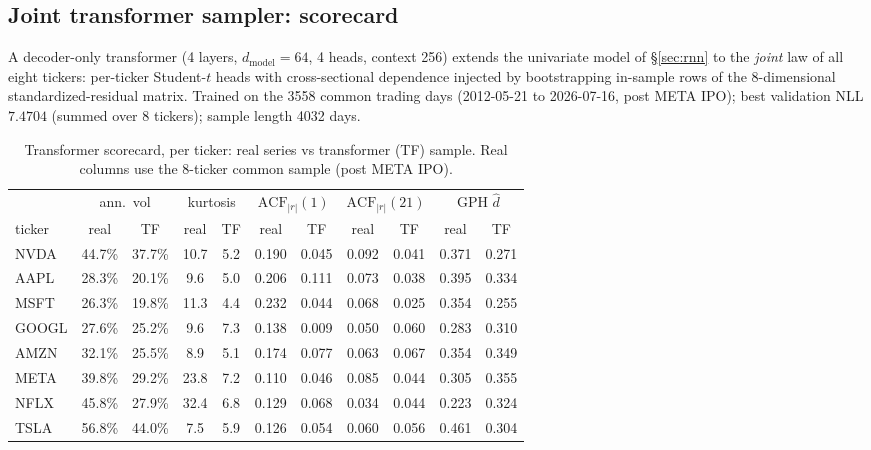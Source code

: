 \documentclass[11pt,a4paper]{article}
\begin{document}
\subsection{Joint transformer sampler: scorecard}\label{sec:v4transformer}

A decoder-only transformer (4 layers, $d_{\mathrm{model}} = 64$, 4 heads,
context 256) extends the univariate model of \S\ref{sec:rnn} to the
\emph{joint} law of all eight tickers: per-ticker Student-$t$ heads with
cross-sectional dependence injected by bootstrapping in-sample rows of the
8-dimensional standardized-residual matrix. Trained on the 3558 common
trading days (2012-05-21 to 2026-07-16, post META IPO); best validation NLL
$7.4704$ (summed over 8 tickers); sample length 4032 days.

\begin{table}[h]
\centering\small
\setlength{\tabcolsep}{4pt}
\begin{tabular}{l cc cc cc cc cc}
\toprule
 & \multicolumn{2}{c}{ann.\ vol} & \multicolumn{2}{c}{kurtosis}
 & \multicolumn{2}{c}{$\mathrm{ACF}_{|r|}(1)$}
 & \multicolumn{2}{c}{$\mathrm{ACF}_{|r|}(21)$}
 & \multicolumn{2}{c}{GPH $\hat d$}\\
\cmidrule(lr){2-3}\cmidrule(lr){4-5}\cmidrule(lr){6-7}\cmidrule(lr){8-9}\cmidrule(lr){10-11}
ticker & real & TF & real & TF & real & TF & real & TF & real & TF\\
\midrule
NVDA  & 44.7\% & 37.7\% & 10.7 & 5.2 & 0.190 & 0.045 & 0.092 & 0.041 & 0.371 & 0.271\\
AAPL  & 28.3\% & 20.1\% &  9.6 & 5.0 & 0.206 & 0.111 & 0.073 & 0.038 & 0.395 & 0.334\\
MSFT  & 26.3\% & 19.8\% & 11.3 & 4.4 & 0.232 & 0.044 & 0.068 & 0.025 & 0.354 & 0.255\\
GOOGL & 27.6\% & 25.2\% &  9.6 & 7.3 & 0.138 & 0.009 & 0.050 & 0.060 & 0.283 & 0.310\\
AMZN  & 32.1\% & 25.5\% &  8.9 & 5.1 & 0.174 & 0.077 & 0.063 & 0.067 & 0.354 & 0.349\\
META  & 39.8\% & 29.2\% & 23.8 & 7.2 & 0.110 & 0.046 & 0.085 & 0.044 & 0.305 & 0.355\\
NFLX  & 45.8\% & 27.9\% & 32.4 & 6.8 & 0.129 & 0.068 & 0.034 & 0.044 & 0.223 & 0.324\\
TSLA  & 56.8\% & 44.0\% &  7.5 & 5.9 & 0.126 & 0.054 & 0.060 & 0.056 & 0.461 & 0.304\\
\bottomrule
\end{tabular}
\caption{Transformer scorecard, per ticker: real series vs transformer (TF)
sample. Real columns use the 8-ticker common sample (post META IPO).}
\label{tab:tfscorecard}
\end{table}
\end{document}
